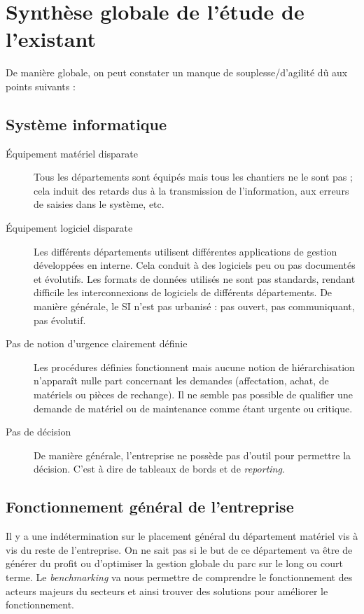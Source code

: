 \section{Synthèse globale de l'étude de l'existant}

De manière globale, on peut constater un manque de souplesse/d'agilité dû
aux points suivants :

\subsection{Système informatique}

\begin{description}
\item[Équipement matériel disparate]\el
Tous les départements sont équipés mais tous les chantiers ne le sont pas ;
cela induit des retards dus à la transmission de l'information, aux erreurs
de saisies dans le système, etc.  

\item[Équipement logiciel disparate]\el
Les différents départements utilisent différentes applications de gestion
développées en interne. Cela conduit à des logiciels peu ou pas documentés
et évolutifs. Les formats de données utilisés ne sont pas standards,
rendant difficile les interconnexions de logiciels de différents
départements. De manière générale, le SI n'est pas urbanisé : pas ouvert,
pas communiquant, pas évolutif.

\item[Pas de notion d'urgence clairement définie]\el
Les procédures définies fonctionnent mais aucune notion de hiérarchisation
n'apparaît nulle part concernant les demandes (affectation, achat, de
matériels ou pièces de rechange).  Il ne semble pas possible de qualifier
une demande de matériel ou de maintenance comme étant urgente ou critique.

\item[Pas de décision]\el
De manière générale, l'entreprise ne possède pas d'outil pour permettre la 
décision. C'est à dire de tableaux de bords et de {\sl reporting}.

\end{description}

\subsection{Fonctionnement général de l'entreprise}

Il y a une indétermination sur le placement général du département matériel 
vis à vis du reste de l'entreprise. On ne sait pas si le but de ce département
va être de générer du profit ou d'optimiser la gestion globale du parc sur le long
ou court terme. Le {\sl benchmarking} va nous permettre de comprendre le 
fonctionnement des acteurs majeurs du secteurs et ainsi trouver des solutions
pour améliorer le fonctionnement.

